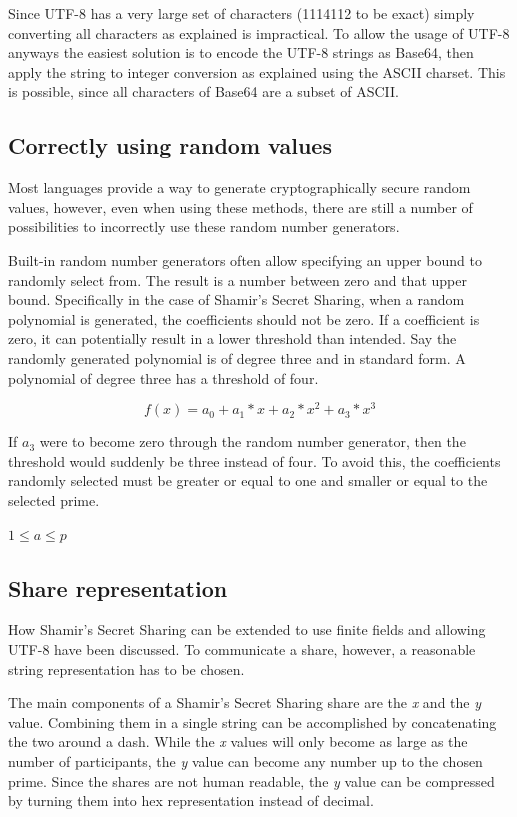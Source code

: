 Since UTF-8 has a very large set of characters (1114112 to be exact) simply
converting all characters as explained is impractical. To allow the usage of
UTF-8 anyways the easiest solution is to encode the UTF-8 strings as Base64,
then apply the string to integer conversion as explained using the ASCII
charset. This is possible, since all characters of Base64 are a subset of
ASCII.

\subsection{Correctly using random values}

Most languages provide a way to generate cryptographically secure random
values, however, even when using these methods, there are still a number of
possibilities to incorrectly use these random number generators.

Built-in random number generators often allow specifying an upper bound to
randomly select from. The result is a number between zero and that upper bound.
Specifically in the case of Shamir's Secret Sharing, when a random polynomial
is generated, the coefficients should not be zero. If a coefficient is zero, it
can potentially result in a lower threshold than intended. Say the randomly
generated polynomial is of degree three and in standard form. A polynomial of
degree three has a threshold of four.

$$f(x) = a_0 + a_1 * x + a_2 * x^2 + a_3 * x^3$$

If $a_3$ were to become zero through the random number generator, then the
threshold would suddenly be three instead of four. To avoid this, the
coefficients randomly selected must be greater or equal to one and smaller or
equal to the selected prime.

$1 \leq a \leq p$

\subsection{Share representation}

How Shamir's Secret Sharing can be extended to use finite fields and allowing
UTF-8 have been discussed. To communicate a share, however, a reasonable string
representation has to be chosen.

The main components of a Shamir's Secret Sharing share are the \textit{x} and
the \textit{y} value. Combining them in a single string can be accomplished by
concatenating the two around a dash. While the \textit{x} values will only
become as large as the number of participants, the \textit{y} value can become
any number up to the chosen prime. Since the shares are not human readable,
the \textit{y} value can be compressed by turning them into hex representation
instead of decimal.

